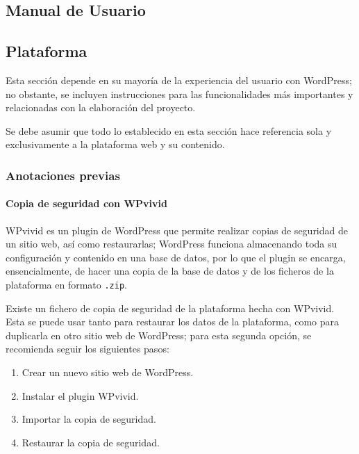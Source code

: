 \begin{appendices}

    \chapter{Manual de Usuario}

        \section{Plataforma}

            Esta sección depende en su mayoría de la experiencia del usuario con WordPress; no obstante, se incluyen instrucciones para las funcionalidades más importantes y relacionadas con la elaboración del proyecto.

            Se debe asumir que todo lo establecido en esta sección hace referencia sola y exclusivamente a la plataforma web y su contenido.

            \subsection{Anotaciones previas}

                \subsubsection{Copia de seguridad con WPvivid}

                    WPvivid \cite{wpvivid} es un plugin de WordPress que permite realizar copias de seguridad de un sitio web, así como restaurarlas; WordPress funciona almacenando toda su configuración y contenido en una base de datos, por lo que el plugin se encarga, ensencialmente, de hacer una copia de la base de datos y de los ficheros de la plataforma en formato \texttt{.zip}.

                    Existe un fichero de copia de seguridad de la plataforma hecha con WPvivid. Esta se puede usar tanto para restaurar los datos de la plataforma, como para duplicarla en otro sitio web de WordPress; para esta segunda opción, se recomienda seguir los siguientes pasos:
                    
                    \begin{enumerate}
                        \item Crear un nuevo sitio web de WordPress.
                        \item Instalar el plugin WPvivid.
                        \item Importar la copia de seguridad.
                        \item Restaurar la copia de seguridad.
                    \end{enumerate}


\end{appendices}
